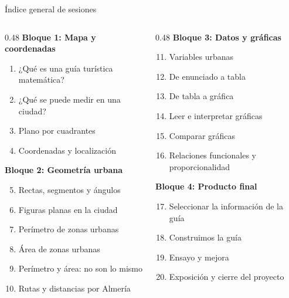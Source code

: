 \documentclass[aspectratio=169, 12pt, spanish]{beamer}
\begin{document}
\begin{frame}{Índice general de sesiones}
  \begin{columns}[T]
    \begin{column}{0.48\textwidth}
      {\color{AlmAzulM}\bfseries Bloque 1: Mapa y coordenadas}
      \begin{enumerate}
        \item ¿Qué es una guía turística matemática?
        \item ¿Qué se puede medir en una ciudad?
        \item Plano por cuadrantes
        \item Coordenadas y localización
      \end{enumerate}
      \vspace{6pt}
      {\color{AlmTerra}\bfseries Bloque 2: Geometría urbana}
      \begin{enumerate}\setcounter{enumi}{4}
        \item Rectas, segmentos y ángulos
        \item Figuras planas en la ciudad
        \item Perímetro de zonas urbanas
        \item Área de zonas urbanas
        \item Perímetro y área: no son lo mismo
        \item Rutas y distancias por Almería
      \end{enumerate}
    \end{column}
    \begin{column}{0.48\textwidth}
      {\color{AlmVerde}\bfseries Bloque 3: Datos y gráficas}
      \begin{enumerate}\setcounter{enumi}{10}
        \item Variables urbanas
        \item De enunciado a tabla
        \item De tabla a gráfica
        \item Leer e interpretar gráficas
        \item Comparar gráficas
        \item Relaciones funcionales y proporcionalidad
      \end{enumerate}
      \vspace{6pt}
      {\color{BCrear}\bfseries Bloque 4: Producto final}
      \begin{enumerate}\setcounter{enumi}{16}
        \item Seleccionar la información de la guía
        \item Construimos la guía
        \item Ensayo y mejora
        \item Exposición y cierre del proyecto
      \end{enumerate}
    \end{column}
  \end{columns}
\end{frame}
\end{document}
